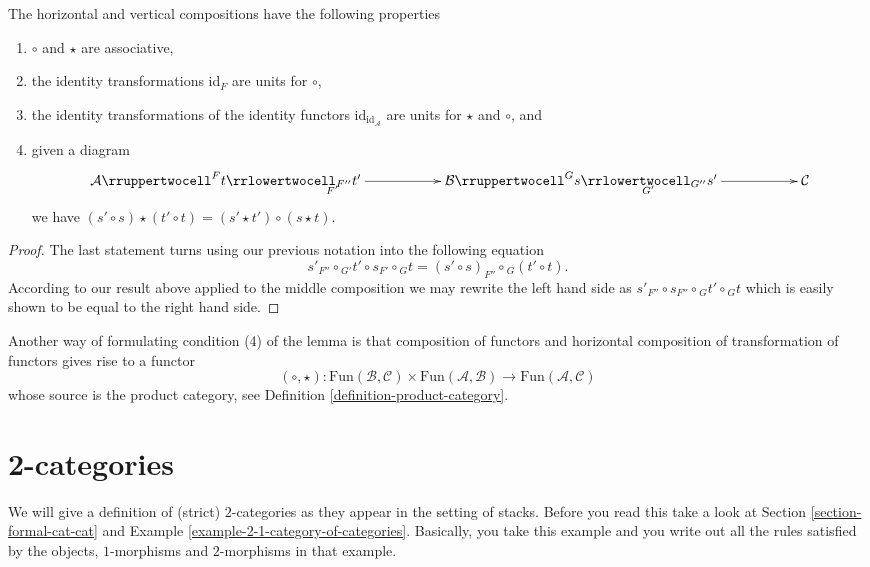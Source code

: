 \begin{lemma}
\label{lemma-properties-2-cat-cats}
The horizontal and vertical compositions have the following
properties
\begin{enumerate}
\item $\circ$ and $\star$ are associative,
\item the identity transformations $\text{id}_F$
are units for $\circ$,
\item the identity transformations of the identity functors
$\text{id}_{\text{id}_\mathcal{A}}$
are units for $\star$ and $\circ$, and
\item given a diagram
$$
\xymatrix{
\mathcal{A}
\rruppertwocell^F{t}
\ar[rr]_(.3){F'}
\rrlowertwocell_{F''}{t'}
& &
\mathcal{B}
\rruppertwocell^G{s}
\ar[rr]_(.3){G'}
\rrlowertwocell_{G''}{s'}
& &
\mathcal{C}
}
$$
we have $ (s' \circ s) \star (t' \circ t) = (s' \star t') \circ (s \star t)$.
\end{enumerate}
\end{lemma}

\begin{proof}
The last statement turns using our previous notation into the following
equation
$$
s'_{F''}
\circ
{}_{G'}t'
\circ
s_{F'}
\circ
{}_Gt
=
(s' \circ s)_{F''}
\circ
{}_G(t' \circ t).
$$
According to our result above applied to the middle composition
we may rewrite the left hand side as
$
s'_{F''}
\circ
s_{F''}
\circ
{}_Gt'
\circ
{}_Gt
$
which is easily shown to be equal to the right hand side.
\end{proof}

\noindent
Another way of formulating condition (4) of the lemma is
that composition of functors and horizontal composition
of transformation of functors gives rise to a functor
$$
(\circ, \star) :
\text{Fun}(\mathcal{B}, \mathcal{C})
\times
\text{Fun}(\mathcal{A}, \mathcal{B})
\longrightarrow
\text{Fun}(\mathcal{A}, \mathcal{C})
$$
whose source is the product category,
see Definition \ref{definition-product-category}.

\section{2-categories}
\label{section-2-categories}

\noindent
We will give a definition of (strict) $2$-categories as they appear
in the setting of stacks. Before you read this take a look at
Section \ref{section-formal-cat-cat} and
Example \ref{example-2-1-category-of-categories}.
Basically, you take this example
and you write out all the rules satisfied by the objects, $1$-morphisms
and $2$-morphisms in that example.

